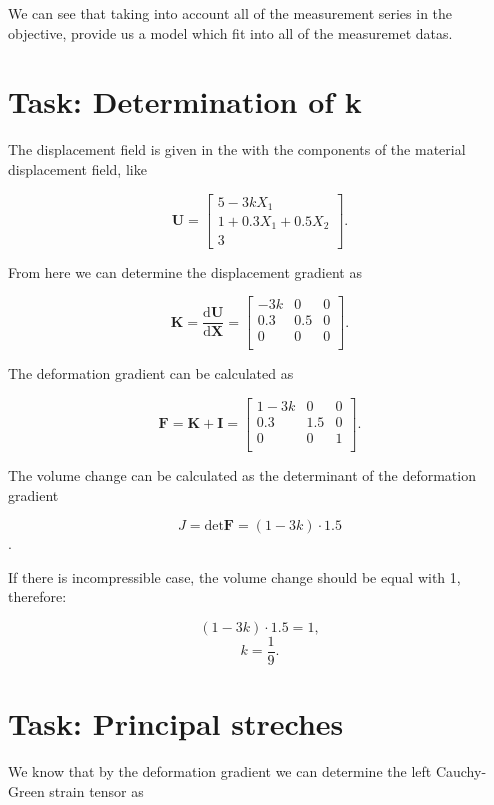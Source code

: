 \documentclass[12pt,a4paper]{article}
\begin{document}
We can see that taking into account all of the measurement series in the objective, provide us a model which fit into all of the measuremet datas.

\newpage

\section{Task: Determination of k}

The displacement field is given in the with the components of the material displacement
field, like

$$
\boldsymbol{U} = 
\begin{bmatrix}
    5 - 3kX_1\\
    1 + 0.3X_1 + 0.5X_2 \\
    3
\end{bmatrix}.
$$

From here we can determine the displacement gradient as

$$
\boldsymbol{K} = \frac{\text{d}\boldsymbol{U}}{\text{d}\boldsymbol{X}} = 
\begin{bmatrix}
    -3k & 0 & 0 \\
    0.3 & 0.5 & 0 \\
    0 & 0 & 0 \\
\end{bmatrix}.
$$

The deformation gradient can be calculated as

$$
\boldsymbol{F} = \boldsymbol{K} + \boldsymbol{I} = 
\begin{bmatrix}
    1-3k & 0 & 0 \\
    0.3 & 1.5 & 0 \\
    0 & 0 & 1 \\
\end{bmatrix}.
$$

The volume change can be calculated as the determinant of the deformation gradient

$$
J = \text{det}\boldsymbol{F} = (1-3k)\cdot 1.5
$$.

If there is incompressible case, the volume change should be equal with 1, therefore:

$$
(1-3k)\cdot 1.5 = 1,
$$
$$
k = \frac{1}{9}.
$$

\section{Task: Principal streches}

We know that by the deformation gradient we can determine the left Cauchy-Green strain tensor as
\end{document}
